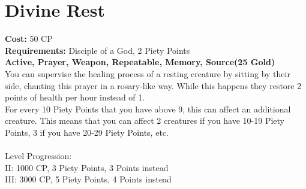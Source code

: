 \section{Divine Rest}
\textbf{Cost:} 50 CP\\
\textbf{Requirements:} Disciple of a God, 2 Piety Points \\
\textbf{Active, Prayer, Weapon, Repeatable, Memory, Source(25 Gold)}\\
You can supervise the healing process of a resting creature by sitting by their side, chanting this prayer in a rosary-like way. While this happens they restore 2 points of health per hour instead of 1.\\
For every 10 Piety Points that you have above 9, this can affect an additional creature. This means that you can affect 2 creatures if you have 10-19 Piety Points, 3 if you have 20-29 Piety Points, etc.\\
\\
Level Progression:\\
II: 1000 CP, 3 Piety Points, 3 Points instead\\
III: 3000 CP, 5 Piety Points, 4 Points instead\\